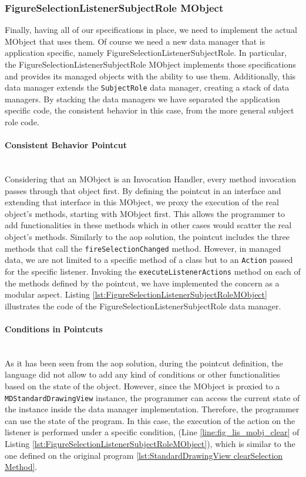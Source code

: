 \subsubsection{FigureSelectionListenerSubjectRole MObject}
Finally, having all of our specifications in place, we need to implement the actual MObject that uses them.
Of course we need a new data manager that is application specific, namely FigureSelectionListenerSubjectRole.
In particular, the FigureSelectionListenerSubjectRole MObject implements those specifications and provides its managed objects with the ability to use them.
Additionally, this data manager extends the \texttt{SubjectRole} data manager, creating a stack of data managers.
By stacking the data managers we have separated the application specific code, the consistent behavior in this case, from the more general subject role code.

\paragraph{Consistent Behavior Pointcut}\mbox{}\\
Considering that an MObject is an Invocation Handler, every method invocation passes through that object first.
By defining the pointcut in an interface and extending that interface in this MObject, we proxy the execution of the real object's methods, starting with MObject first.
This allows the programmer to add functionalities in these methods which in other cases would scatter the real object's methods.
Similarly to the \ac{aop} solution, the pointcut includes the three methods that call the \texttt{fireSelectionChanged} method.
However, in managed data, we are not limited to a specific method of a class but to an \texttt{Action} passed for the specific listener.
Invoking the \texttt{executeListenerActions} method on each of the methods defined by the pointcut, we have implemented the concern as a modular aspect.
Listing \ref{lst:FigureSelectionListenerSubjectRoleMObject} illustrates the code of the FigureSelectionListenerSubjectRole data manager.

\paragraph{Conditions in Pointcuts}\mbox{}\\
As it has been seen from the \ac{aop} solution, during the pointcut definition, the language did not allow to add any kind of conditions or other functionalities based on the state of the object.
However, since the MObject is proxied to a \texttt{MDStandardDrawingView} instance, the programmer can access the current state of the instance inside the data manager implementation.
Therefore, the programmer can use the state of the program.
In this case, the execution of the action on the listener is performed under a specific condition, (Line \ref{line:fig_lis_mobj_clear} of Listing \ref{lst:FigureSelectionListenerSubjectRoleMObject}), which is similar to the one defined on the original program \ref{lst:StandardDrawingView clearSelection Method}.

